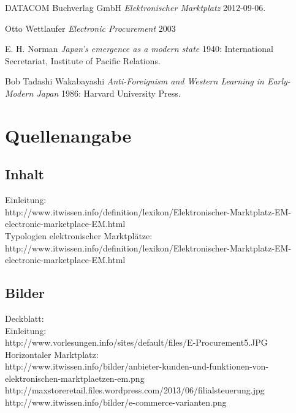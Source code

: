 \documentclass[11pt,a4paper]{article}
\begin{document}
\newpage
\begin{thebibliography}{1}
	
	 DATACOM Buchverlag GmbH {\em Elektronischer Marktplatz}  2012-09-06.
	
	  Otto Wettlaufer {\em Electronic Procurement} 2003
	
	 E. H. Norman {\em Japan's emergence as a modern
		state} 1940: International Secretariat, Institute of Pacific
	Relations.
	
	 Bob Tadashi Wakabayashi {\em Anti-Foreignism and Western
		Learning in Early-Modern Japan} 1986: Harvard University Press.
	
\end{thebibliography}
\section{Quellenangabe}
\subsection{Inhalt}
Einleitung: \\
http://www.itwissen.info/definition/lexikon/Elektronischer-Marktplatz-EM-electronic-marketplace-EM.html \\
Typologien elektronischer Marktplätze: \\
http://www.itwissen.info/definition/lexikon/Elektronischer-Marktplatz-EM-electronic-marketplace-EM.html \\
\subsection{Bilder}
Deckblatt: \\
Einleitung: \\ http://www.vorlesungen.info/sites/default/files/E-Procurement5.JPG \\
Horizontaler Marktplatz: \\
http://www.itwissen.info/bilder/anbieter-kunden-und-funktionen-von-elektronischen-marktplaetzen-em.png
\\ 
http://maxstoreretail.files.wordpress.com/2013/06/filialsteuerung.jpg \\
http://www.itwissen.info/bilder/e-commerce-varianten.png \\
\end{document}
